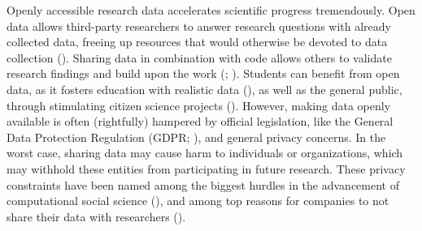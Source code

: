 \documentclass[
]{article}
\begin{document}
Openly accessible research data accelerates scientific progress
tremendously. Open data allows third-party researchers to answer
research questions with already collected data, freeing up resources
that would otherwise be devoted to data collection
(). Sharing data in combination with code allows others to validate
research findings and build upon the work
(;
). Students can
benefit from open data, as it fosters education with realistic data
(), as
well as the general public, through stimulating citizen science projects
(). However, making
data openly available is often (rightfully) hampered by official
legislation, like the General Data Protection Regulation (GDPR;
), and general privacy concerns. In the worst case, sharing
data may cause harm to individuals or organizations, which may withhold
these entities from participating in future research. These privacy
constraints have been named among the biggest hurdles in the advancement
of computational social science (), and among top reasons for companies to not share their data
with researchers ().
\end{document}
